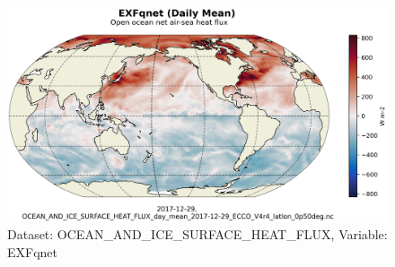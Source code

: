 \begin{figure}[H]
\centering
\includegraphics[scale=0.55]{../images/plots/latlon_plots/Ocean_and_Sea-Ice_Surface_Heat_Fluxes/EXFqnet.png}
\caption{Dataset: OCEAN\_AND\_ICE\_SURFACE\_HEAT\_FLUX, Variable: EXFqnet}
\label{tab:table-OCEAN_AND_ICE_SURFACE_HEAT_FLUX_EXFqnet-Plot}
\end{figure}
\pagebreak

